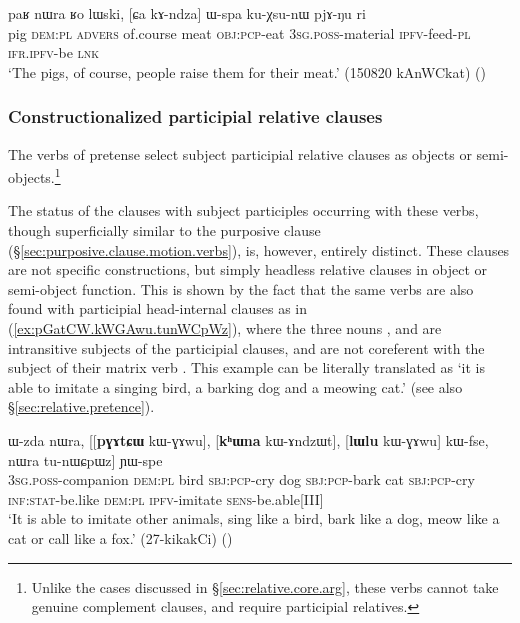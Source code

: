 \begin{exe}
	\ex \label{ex:Ca.kAndza.Wspa}
	\gll paʁ nɯra ʁo lɯski, [ɕa kɤ-ndza] ɯ-spa ku-χsu-nɯ pjɤ-ŋu ri \\
	pig \textsc{dem}:\textsc{pl} \textsc{advers} of.course meat \textsc{obj}:\textsc{pcp}-eat \textsc{3sg}.\textsc{poss}-material \textsc{ipfv}-feed-\textsc{pl} \textsc{ifr}.\textsc{ipfv}-be \textsc{lnk} \\
	\glt `The pigs, of course, people raise them for their meat.' (150820 kAnWCkat)
()
\end{exe}



\subsubsection{Constructionalized participial relative clauses} \label{sec:constr.participial.clause}
The verbs of pretense select subject participial relative clauses as objects or semi-objects.\footnote{Unlike the cases discussed in §\ref{sec:relative.core.arg}, these verbs cannot take genuine complement clauses, and require participial relatives. } 

The status of the clauses with subject participles occurring with these verbs, though superficially similar to the purposive clause (§\ref{sec:purposive.clause.motion.verbs}), is, however, entirely distinct. These clauses are not specific constructions, but simply headless relative clauses in object or semi-object function. This is shown by the fact that the same verbs are also found with participial head-internal clauses as in (\ref{ex:pGatCW.kWGAwu.tunWCpWz}), where the three nouns ,  and  are intransitive subjects of the participial clauses, and are not coreferent with the subject of their matrix verb . This example can be literally translated as `it is able to imitate a singing bird, a barking dog and a meowing cat.' (see also  §\ref{sec:relative.pretence}).

\begin{exe}
	\ex \label{ex:pGatCW.kWGAwu.tunWCpWz}
	\gll ɯ-zda nɯra, [[\textbf{pɣɤtɕɯ} kɯ-ɣɤwu], [\textbf{kʰɯna} kɯ-ɤndzɯt], [\textbf{lɯlu} kɯ-ɣɤwu] kɯ-fse, nɯra tu-nɯɕpɯz] ɲɯ-spe \\
	\textsc{3sg}.\textsc{poss}-companion \textsc{dem}:\textsc{pl} bird \textsc{sbj}:\textsc{pcp}-cry dog \textsc{sbj}:\textsc{pcp}-bark cat \textsc{sbj}:\textsc{pcp}-cry \textsc{inf}:\textsc{stat}-be.like \textsc{dem}:\textsc{pl} \textsc{ipfv}-imitate \textsc{sens}-be.able[III] \\
	\glt `It is able to imitate other animals, sing like a bird, bark like a dog, meow like a cat or call like a fox.' (27-kikakCi)
	()
\end{exe}


